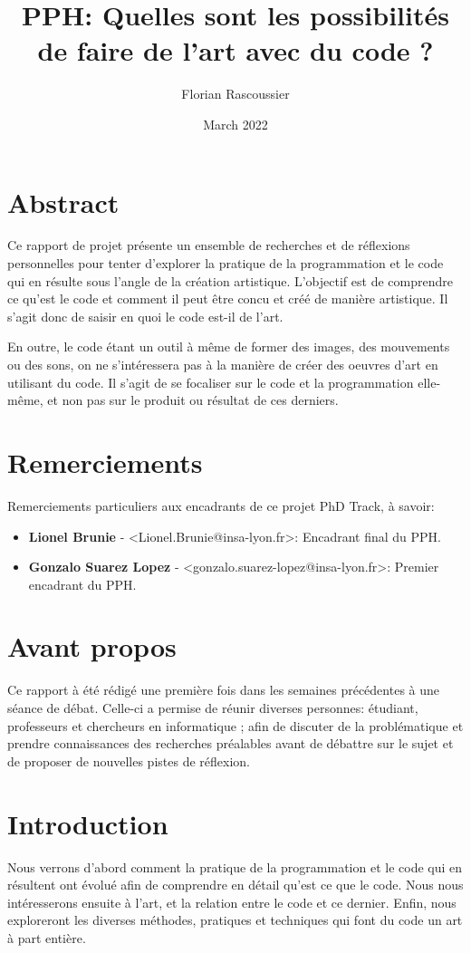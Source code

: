 \documentclass[12pt]{article} %
\title{PPH: Quelles sont les possibilités de faire de l'art avec du code ?}
\author{Florian Rascoussier}
\date{March 2022}
\begin{document}

\newpage


\newpage

\section*{Abstract}
Ce rapport de projet présente un ensemble de recherches et de réflexions personnelles pour tenter d'explorer la pratique de la programmation et le code qui en résulte sous l'angle de la création artistique. L'objectif est de comprendre ce qu'est le code et comment il peut être concu et créé de manière artistique. Il s'agit donc de saisir en quoi le code est-il de l'art.

En outre, le code étant un outil à même de former des images, des mouvements ou des sons, on ne s'intéressera pas à la manière de créer des oeuvres d'art en utilisant du code. Il s'agit de se focaliser sur le code et la programmation elle-même, et non pas sur le produit ou résultat de ces derniers.

\section*{Remerciements}
Remerciements particuliers aux encadrants de ce projet PhD Track, à savoir:

\begin{itemize}
    \item \textbf{Lionel Brunie} - <Lionel.Brunie@insa-lyon.fr>: Encadrant final  du PPH.
    \item \textbf{Gonzalo Suarez Lopez} - <gonzalo.suarez-lopez@insa-lyon.fr>: Premier encadrant du PPH.
\end{itemize}

\section*{Avant propos}
Ce rapport à été rédigé une première fois dans les semaines précédentes à une séance de débat. Celle-ci a permise de réunir diverses personnes: étudiant, professeurs et chercheurs en informatique ; afin de discuter de la problématique et prendre connaissances des recherches préalables avant de débattre sur le sujet et de proposer de nouvelles pistes de réflexion.

\newpage
\tableofcontents

\newpage
{} %

\section{Introduction}
Nous verrons d'abord comment la pratique de la programmation et le code qui en résultent ont évolué afin de comprendre en détail qu'est ce que le code. Nous nous intéresserons ensuite à l'art, et la relation entre le code et ce dernier. Enfin, nous exploreront les diverses méthodes, pratiques et techniques qui font du code un art à part entière.
\end{document}
